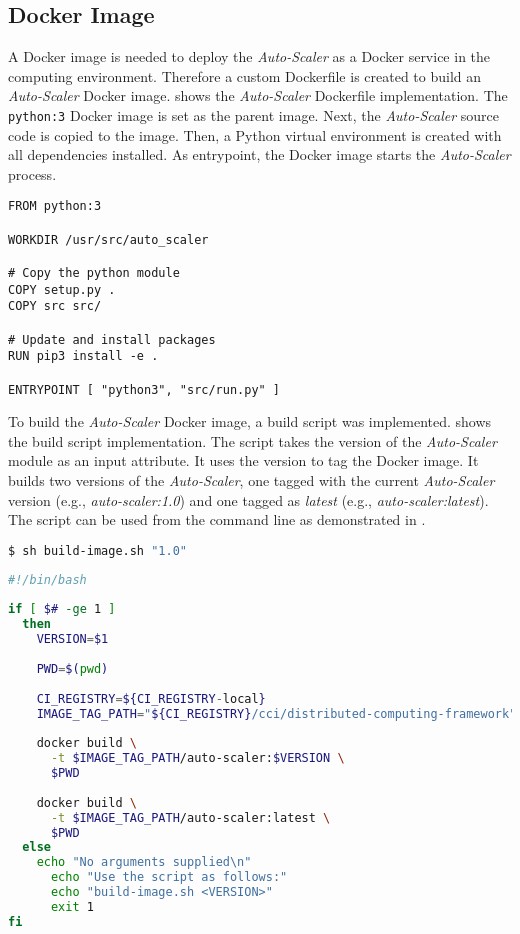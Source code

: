 \subsection{Docker Image}
A Docker image is needed to deploy the \textit{Auto-Scaler} as a Docker service in the computing environment. Therefore a custom Dockerfile is created to build an \textit{Auto-Scaler} Docker image.
 shows the \textit{Auto-Scaler} Dockerfile implementation. The \texttt{python:3} Docker image is set as the parent image. 
Next, the \textit{Auto-Scaler} source code is copied to the image. Then, a Python virtual environment is created with all dependencies installed.
As entrypoint, the Docker image starts the \textit{Auto-Scaler} process.
\begin{lstlisting}[label=lst:06_auto-scaler_dockerfile, caption=\textit{Auto-Scaler} Dockerfile]
FROM python:3
 
WORKDIR /usr/src/auto_scaler
 
# Copy the python module
COPY setup.py .
COPY src src/
 
# Update and install packages
RUN pip3 install -e .
 
ENTRYPOINT [ "python3", "src/run.py" ]
\end{lstlisting}


To build the \textit{Auto-Scaler} Docker image, a build script was implemented.  shows the build script implementation.
The script takes the version of the \textit{Auto-Scaler} module as an input attribute. It uses the version to tag the Docker image.
It builds two versions of the \textit{Auto-Scaler}, one tagged with the current \textit{Auto-Scaler} version (e.g., \textit{auto-scaler:1.0}) and one tagged as \textit{latest} (e.g., \textit{auto-scaler:latest}). 
The script can be used from the command line as demonstrated in .
\begin{lstlisting}[label=lst:06_auto-scaler_build-use, caption=\textit{Auto-Scaler} build-script usage, language=sh, numbers=none]
$ sh build-image.sh "1.0"
\end{lstlisting}
\newpage
\begin{lstlisting}[label=lst:06_auto-scaler_build, caption=\textit{Auto-Scaler} build script, language=sh]
#!/bin/bash
 
if [ $# -ge 1 ]
  then
    VERSION=$1
 
    PWD=$(pwd)
 
    CI_REGISTRY=${CI_REGISTRY-local}
    IMAGE_TAG_PATH="${CI_REGISTRY}/cci/distributed-computing-framework"
 
    docker build \
      -t $IMAGE_TAG_PATH/auto-scaler:$VERSION \
      $PWD
 
    docker build \
      -t $IMAGE_TAG_PATH/auto-scaler:latest \
      $PWD
  else
    echo "No arguments supplied\n"
      echo "Use the script as follows:"
      echo "build-image.sh <VERSION>"
      exit 1
fi
\end{lstlisting}



